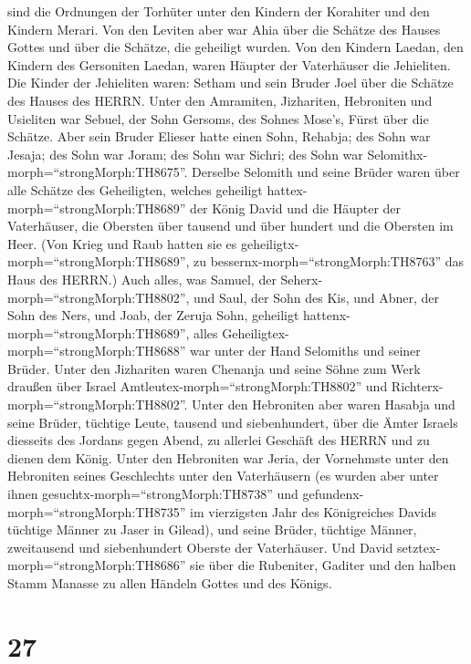 sind die Ordnungen der Torhüter unter den Kindern der Korahiter und den
Kindern Merari.  Von den Leviten aber war Ahia über die
Schätze des Hauses Gottes und über die Schätze, die geheiligt wurden.
 Von den Kindern Laedan, den Kindern des Gersoniten Laedan,
waren Häupter der Vaterhäuser die Jehieliten.  Die Kinder
der Jehieliten waren: Setham und sein Bruder Joel über die Schätze des
Hauses des HERRN.  Unter den Amramiten, Jizhariten,
Hebroniten und Usieliten  war Sebuel, der Sohn Gersoms, des
Sohnes Mose's, Fürst über die Schätze.  Aber sein Bruder
Elieser hatte einen Sohn, Rehabja; des Sohn war Jesaja; des Sohn war
Joram; des Sohn war Sichri; des Sohn war
Selomithx-morph=``strongMorph:TH8675''.  Derselbe Selomith
und seine Brüder waren über alle Schätze des Geheiligten, welches
geheiligt hattex-morph=``strongMorph:TH8689'' der König David und die
Häupter der Vaterhäuser, die Obersten über tausend und über hundert und
die Obersten im Heer.  (Von Krieg und Raub hatten sie es
geheiligtx-morph=``strongMorph:TH8689'', zu
bessernx-morph=``strongMorph:TH8763'' das Haus des HERRN.) 
Auch alles, was Samuel, der Seherx-morph=``strongMorph:TH8802'', und
Saul, der Sohn des Kis, und Abner, der Sohn des Ners, und Joab, der
Zeruja Sohn, geheiligt hattenx-morph=``strongMorph:TH8689'', alles
Geheiligtex-morph=``strongMorph:TH8688'' war unter der Hand Selomiths
und seiner Brüder.  Unter den Jizhariten waren Chenanja und
seine Söhne zum Werk draußen über Israel
Amtleutex-morph=``strongMorph:TH8802'' und
Richterx-morph=``strongMorph:TH8802''.  Unter den
Hebroniten aber waren Hasabja und seine Brüder, tüchtige Leute, tausend
und siebenhundert, über die Ämter Israels diesseits des Jordans gegen
Abend, zu allerlei Geschäft des HERRN und zu dienen dem König.
 Unter den Hebroniten war Jeria, der Vornehmste unter den
Hebroniten seines Geschlechts unter den Vaterhäusern (es wurden aber
unter ihnen gesuchtx-morph=``strongMorph:TH8738'' und
gefundenx-morph=``strongMorph:TH8735'' im vierzigsten Jahr des
Königreiches Davids tüchtige Männer zu Jaser in Gilead), 
und seine Brüder, tüchtige Männer, zweitausend und siebenhundert Oberste
der Vaterhäuser. Und David setztex-morph=``strongMorph:TH8686'' sie über
die Rubeniter, Gaditer und den halben Stamm Manasse zu allen Händeln
Gottes und des Königs.

\hypertarget{section-26}{%
\section{27}\label{section-26}}

